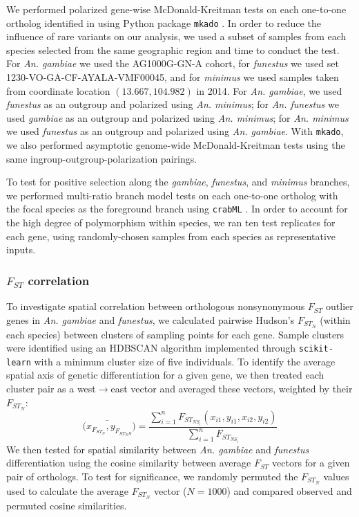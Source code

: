 We performed polarized gene-wise McDonald-Kreitman tests on each one-to-one 
ortholog identified in  using Python package \texttt{mkado} \citep{mkado}. 
In order to reduce the influence of rare variants on our analysis, we used a subset 
of samples from each species selected from the same geographic region and time to conduct the test. 
For \textit{An. gambiae} we used the AG1000G-GN-A cohort, for \textit{funestus} we 
used set 1230-VO-GA-CF-AYALA-VMF00045, and for \textit{minimus} we used samples 
taken from coordinate location $(13.667, 104.982)$ in 2014.
For \textit{An. gambiae}, we used \textit{funestus} as an outgroup and polarized 
using \textit{An. minimus}; for \textit{An. funestus} we used \textit{gambiae} as an 
outgroup and polarized using \textit{An. minimus}; for \textit{An. minimus} we used
 \textit{funestus} as an outgroup and polarized using \textit{An. gambiae}.
With \texttt{mkado}, we also performed asymptotic genome-wide McDonald-Kreitman 
tests using the same ingroup-outgroup-polarization pairings.

To test for positive selection along the \textit{gambiae}, \textit{funestus}, and \textit{minimus} 
branches, we performed multi-ratio branch model tests on each one-to-one ortholog with the 
focal species as the foreground branch using \texttt{crabML} \citep{crabml2025, yang2007paml}. 
In order to account for the high degree of polymorphism within species, we ran ten test 
replicates for each gene, using randomly-chosen samples from each species as representative inputs. 

\subsubsection{$F_{ST}$ correlation} \label{sec:fst}

To investigate spatial correlation between orthologous nonsynonymous $F_{ST}$ outlier genes in \textit{An. gambiae} and \textit{funestus}, 
we calculated pairwise Hudson's $F_{ST_{N}}$ (within each species) between clusters of sampling points for each gene.
Sample clusters were identified using an HDBSCAN algorithm implemented through \texttt{scikit-learn} with a minimum cluster size of five individuals.
To identify the average spatial axis of genetic differentiation for a given gene, we then treated each cluster pair as a west$\rightarrow$east vector and averaged these vectors, weighted by their $F_{ST_{N}}$:
$$\bar{(x_{F_{ST_{N}}}, y_{F_{ST_NS}}}) =\frac{\sum_{i=1}^{n}{F_{ST_{NS_i}} (x_{i1}, y_{i1}, x_{i2}, y_{i2})}}{\sum_{i=1}^{n}{F_{ST_{NS_i}}}}$$
We then tested for spatial similarity between \textit{An. gambiae} and \textit{funestus} differentiation using the cosine similarity between average $F_{ST}$ vectors for a given pair of orthologs.
To test for significance, we randomly permuted the $F_{ST_{N}}$ values used to calculate the average $F_{ST_{N}}$ vector ($N=1000$) and compared observed and permuted cosine similarities.

